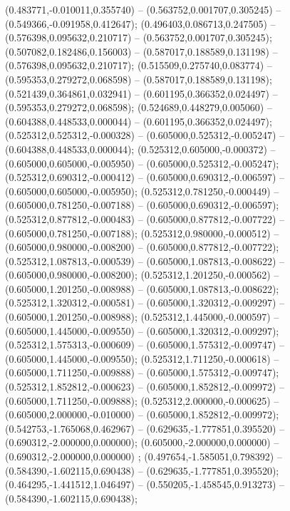  (0.483771,-0.010011,0.355740) -- (0.563752,0.001707,0.305245) -- (0.549366,-0.091958,0.412647);
 (0.496403,0.086713,0.247505) -- (0.576398,0.095632,0.210717) -- (0.563752,0.001707,0.305245);
 (0.507082,0.182486,0.156003) -- (0.587017,0.188589,0.131198) -- (0.576398,0.095632,0.210717);
 (0.515509,0.275740,0.083774) -- (0.595353,0.279272,0.068598) -- (0.587017,0.188589,0.131198);
 (0.521439,0.364861,0.032941) -- (0.601195,0.366352,0.024497) -- (0.595353,0.279272,0.068598);
 (0.524689,0.448279,0.005060) -- (0.604388,0.448533,0.000044) -- (0.601195,0.366352,0.024497);
 (0.525312,0.525312,-0.000328) -- (0.605000,0.525312,-0.005247) -- (0.604388,0.448533,0.000044);
 (0.525312,0.605000,-0.000372) -- (0.605000,0.605000,-0.005950) -- (0.605000,0.525312,-0.005247);
 (0.525312,0.690312,-0.000412) -- (0.605000,0.690312,-0.006597) -- (0.605000,0.605000,-0.005950);
 (0.525312,0.781250,-0.000449) -- (0.605000,0.781250,-0.007188) -- (0.605000,0.690312,-0.006597);
 (0.525312,0.877812,-0.000483) -- (0.605000,0.877812,-0.007722) -- (0.605000,0.781250,-0.007188);
 (0.525312,0.980000,-0.000512) -- (0.605000,0.980000,-0.008200) -- (0.605000,0.877812,-0.007722);
 (0.525312,1.087813,-0.000539) -- (0.605000,1.087813,-0.008622) -- (0.605000,0.980000,-0.008200);
 (0.525312,1.201250,-0.000562) -- (0.605000,1.201250,-0.008988) -- (0.605000,1.087813,-0.008622);
 (0.525312,1.320312,-0.000581) -- (0.605000,1.320312,-0.009297) -- (0.605000,1.201250,-0.008988);
 (0.525312,1.445000,-0.000597) -- (0.605000,1.445000,-0.009550) -- (0.605000,1.320312,-0.009297);
 (0.525312,1.575313,-0.000609) -- (0.605000,1.575312,-0.009747) -- (0.605000,1.445000,-0.009550);
 (0.525312,1.711250,-0.000618) -- (0.605000,1.711250,-0.009888) -- (0.605000,1.575312,-0.009747);
 (0.525312,1.852812,-0.000623) -- (0.605000,1.852812,-0.009972) -- (0.605000,1.711250,-0.009888);
 (0.525312,2.000000,-0.000625) -- (0.605000,2.000000,-0.010000) -- (0.605000,1.852812,-0.009972);
 (0.542753,-1.765068,0.462967) -- (0.629635,-1.777851,0.395520) -- (0.690312,-2.000000,0.000000);
 (0.605000,-2.000000,0.000000) -- (0.690312,-2.000000,0.000000) ;
 (0.497654,-1.585051,0.798392) -- (0.584390,-1.602115,0.690438) -- (0.629635,-1.777851,0.395520);
 (0.464295,-1.441512,1.046497) -- (0.550205,-1.458545,0.913273) -- (0.584390,-1.602115,0.690438);
